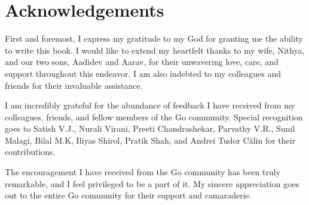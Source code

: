 \cleardoublepage
{}
\chapter*{Acknowledgements}

First and foremost, I express my gratitude to my God for granting me the ability
to write this book. I would like to extend my heartfelt thanks to my wife,
Nithya, and our two sons, Aadidev and Aarav, for their unwavering love, care,
and support throughout this endeavor. I am also indebted to my colleagues and
friends for their invaluable assistance.

I am incredibly grateful for the abundance of feedback I have received from my
colleagues, friends, and fellow members of the Go community. Special recognition
goes to Satish V.J., Nurali Virani, Preeti Chandrashekar, Parvathy V.R., Sunil
Malagi, Bilal M.K, Iliyas Shirol, Pratik Shah, and Andrei Tudor Călin for their
contributions.

The encouragement I have received from the Go community has been truly
remarkable, and I feel privileged to be a part of it. My sincere appreciation
goes out to the entire Go community for their support and camaraderie.
